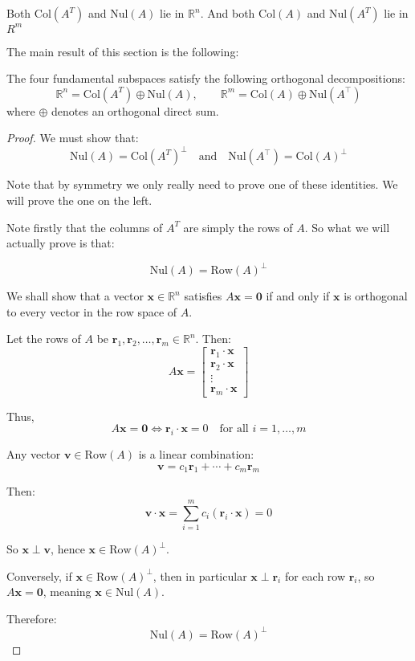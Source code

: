 Both $\mathrm{Col}(A^T)$ and $\mathrm{Nul}(A)$ lie in $\mathbb{R}^n$. And both $\mathrm{Col}(A)$ and $\mathrm{Nul}(A^T)$ lie in $R^m$

The main result of this section is the following:

\begin{theorem}
The four fundamental subspaces satisfy the following orthogonal decompositions:
\[
\mathbb{R}^n = \mathrm{Col}(A^T) \oplus \mathrm{Nul}(A), \qquad
\mathbb{R}^m = \mathrm{Col}(A) \oplus \mathrm{Nul}(A^\top)
\]
where \( \oplus \) denotes an orthogonal direct sum.

\begin{proof}
We must show that:
\[
\boxed{\mathrm{Nul}(A) = \mathrm{Col}(A^T)^\perp} \quad \text{and} \quad \boxed{\mathrm{Nul}(A^\top) = \mathrm{Col}(A)^\perp}
\]

Note that by symmetry we only really need to prove one of these identities. We will prove the one on the left. 

Note firstly that the columns of $A^T$ are simply the rows of $A$.
So what we will actually prove is that:

\[ \mathrm{Nul}(A) = \mathrm{Row}(A)^\perp\]

We shall show that a vector \( \mathbf{x} \in \mathbb{R}^n \) satisfies \( A\mathbf{x} = \mathbf{0} \) if and only if \( \mathbf{x} \) is orthogonal to every vector in the row space of \( A \).

Let the rows of \( A \) be \( \mathbf{r}_1, \mathbf{r}_2, \dots, \mathbf{r}_m \in \mathbb{R}^n \). Then:
\[
A\mathbf{x} = 
\begin{bmatrix}
\mathbf{r}_1 \cdot \mathbf{x} \\
\mathbf{r}_2 \cdot \mathbf{x} \\
\vdots \\
\mathbf{r}_m \cdot \mathbf{x}
\end{bmatrix}
\]

Thus,
\[
A\mathbf{x} = \mathbf{0} \iff \mathbf{r}_i \cdot \mathbf{x} = 0 \quad \text{for all } i = 1, \dots, m
\]

Any vector \( \mathbf{v} \in \mathrm{Row}(A) \) is a linear combination:
\[
\mathbf{v} = c_1 \mathbf{r}_1 + \cdots + c_m \mathbf{r}_m
\]

Then:
\[
\mathbf{v} \cdot \mathbf{x} = \sum_{i=1}^m c_i (\mathbf{r}_i \cdot \mathbf{x}) = 0
\]

So \( \mathbf{x} \perp \mathbf{v} \), hence \( \mathbf{x} \in \mathrm{Row}(A)^\perp \).

Conversely, if \( \mathbf{x} \in \mathrm{Row}(A)^\perp \), then in particular \( \mathbf{x} \perp \mathbf{r}_i \) for each row \( \mathbf{r}_i \), so \( A\mathbf{x} = \mathbf{0} \), meaning \( \mathbf{x} \in \mathrm{Nul}(A) \).

Therefore:
\[
\boxed{\mathrm{Nul}(A) = \mathrm{Row}(A)^\perp}
\]



\end{proof}


\end{theorem}




